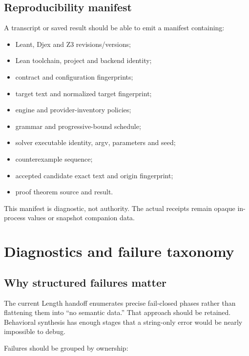 \documentclass[11pt,oneside]{report}
\begin{document}
\section{Reproducibility manifest}

A transcript or saved result should be able to emit a manifest containing:

\begin{itemize}[leftmargin=2em]
\item Leant, Djex and Z3 revisions/versions;
\item Lean toolchain, project and backend identity;
\item contract and configuration fingerprints;
\item target text and normalized target fingerprint;
\item engine and provider-inventory policies;
\item grammar and progressive-bound schedule;
\item solver executable identity, argv, parameters and seed;
\item counterexample sequence;
\item accepted candidate exact text and origin fingerprint;
\item proof theorem source and result.
\end{itemize}

This manifest is diagnostic, not authority. The actual receipts remain opaque in-process values or snapshot companion data.

\chapter{Diagnostics and failure taxonomy}
\label{chap:diagnostics}

\section{Why structured failures matter}

The current Length handoff enumerates precise fail-closed phases rather than flattening them into ``no semantic data.'' That approach should be retained. Behavioral synthesis has enough stages that a string-only error would be nearly impossible to debug.

Failures should be grouped by ownership:
\end{document}

